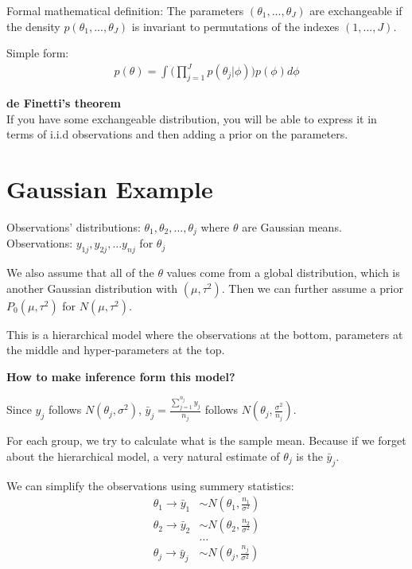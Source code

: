\documentclass[twoside]{article}
\begin{document}
Formal mathematical definition:
The parameters $(\theta_1, ... ,\theta_J)$ are exchangeable if the density $p(\theta_1, ..., \theta_J)$ is invariant to permutations of the indexes $(1,...,J)$. 

Simple form:
\begin{align*}
    p(\theta) = \int \bigg( \prod_{j=1}^{J} p(\theta_j|\phi) \bigg) p(\phi) d\phi
\end{align*}

\textbf{de Finetti's theorem}\\
If you have some exchangeable distribution, you will be able to express it in terms of i.i.d observations and then adding a prior on the parameters.


\section{Gaussian Example}


Observations' distributions: $\theta_1, \theta_2, ... ,\theta_j$ where $\theta$ are Gaussian means.\\
Observations: $y_{1j}, y_{2j}, ... y_{nj}$ for $\theta_j$

We also assume that all of the $\theta$ values come from a global distribution, which is another Gaussian distribution with $(\mu, \tau^2)$. Then we can further assume a prior $P_0(\mu, \tau^2)$ for $N(\mu, \tau^2)$. 

This is a hierarchical model where the observations at the bottom, parameters at the middle and hyper-parameters at the top.

\textbf{How to make inference form this model?}

Since $y_j$ follows $N(\theta_j, \sigma^2)$, $\bar{y}_j = \frac{\sum_{j=1}^{n_j} y_j}{n_j}$ follows $N(\theta_j, \frac{\sigma^2}{n_j})$.

For each group, we try to calculate what is the sample mean. Because if we forget about the hierarchical model, a very natural estimate of $\theta_j$ is the $\bar{y}_j$. 

We can simplify the observations using summery statistics:
\begin{align*}
    \theta_1  \rightarrow \bar{y}_1 & \sim N(\theta_1, \frac{n_1}{\sigma^2}) \\ 
    \theta_2  \rightarrow \bar{y}_2 & \sim N(\theta_2, \frac{n_2}{\sigma^2}) \\ 
    & \dots \\ 
    \theta_j  \rightarrow \bar{y}_j & \sim N(\theta_j, \frac{n_j}{\sigma^2})
\end{align*}
\end{document}
